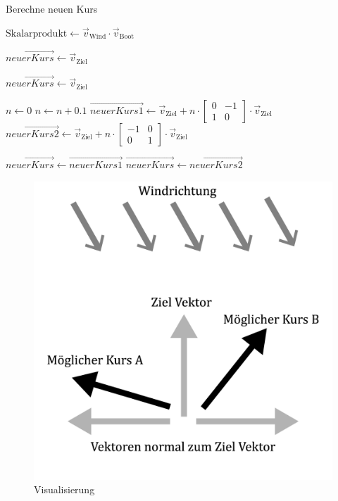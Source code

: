 \begin{algorithm}
\caption{Berechne neuen Kurs}
\begin{algorithmic}[1]
    \State $\text{Skalarprodukt} \gets \vec{v}_{\text{Wind}} \cdot \vec{v}_{\text{Boot}}$
    
    \State $\vec{neuerKurs} \gets \vec{v}_{\text{Ziel}}$
    
            \State $\vec{neuerKurs} \gets \vec{v}_{\text{Ziel}}$
            \State \Return {}
        \EndIf
        
        \State $n \gets 0$
            \State $n \gets n + 0.1$
            \State $\vec{neuerKurs1} \gets \vec{v}_{\text{Ziel}} + n \cdot \begin{bmatrix}0 & -1 \\ 1 & 0\end{bmatrix} \cdot \vec{v}_{\text{Ziel}}$
            \State $\vec{neuerKurs2} \gets \vec{v}_{\text{Ziel}} + n \cdot \begin{bmatrix}-1 & 0 \\ 0 & 1\end{bmatrix} \cdot \vec{v}_{\text{Ziel}}$
            
                \State $\vec{neuerKurs} \gets \vec{neuerKurs1}$
            \Else
                \State $\vec{neuerKurs} \gets \vec{neuerKurs2}$
            \EndIf
        \EndWhile
        
        \State \Return {}
    \EndIf
\EndFunction
\end{algorithmic}
\end{algorithm}
 

\begin{figure}[H]
    \centering
    \includegraphics[width=0.5\linewidth]{algorythmus Vektoren.png}
    \caption{Visualisierung}
    \label{fig:enter-label}
\end{figure}







